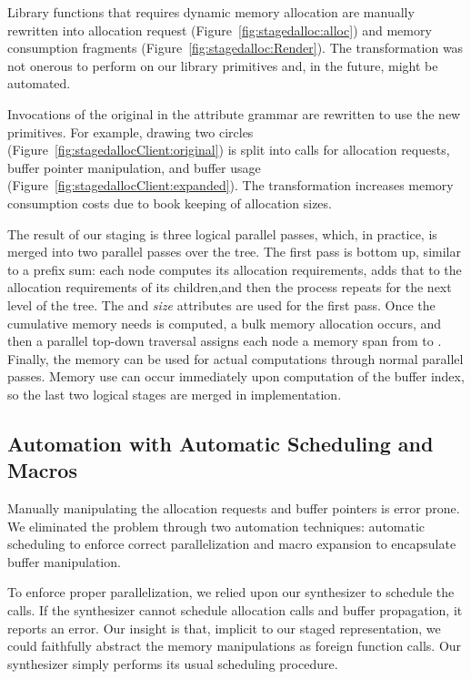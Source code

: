 Library functions that requires dynamic memory allocation are manually rewritten into allocation request  (Figure~\ref{fig:stagedalloc:alloc}) and memory consumption fragments (Figure~\ref{fig:stagedalloc:Render}). The transformation was not onerous to perform on our library primitives and, in the future, might be automated. 

Invocations of the original in the attribute grammar are rewritten to use the new primitives. For example, drawing two circles (Figure~\ref{fig:stagedallocClient:original}) is split into calls for allocation requests, buffer pointer manipulation, and buffer usage (Figure~\ref{fig:stagedallocClient:expanded}). The transformation increases memory consumption costs due to book keeping of allocation sizes. 

The result of our staging is three logical parallel passes, which, in practice, is merged into two parallel passes over the tree. The first pass is bottom up, similar to a prefix sum: each node computes its allocation requirements, adds that to the allocation requirements of its children,and then the process repeats for the next level of the tree. The  and \emph{size} attributes are used for the first pass. Once the cumulative memory needs is computed, a bulk memory allocation occurs, and then a parallel top-down traversal assigns each node a memory span from  to . Finally, the memory can be used for actual computations through normal parallel passes. Memory use can occur immediately upon computation of the buffer index, so the last two logical stages are merged in implementation.

\subsection{Automation with Automatic Scheduling and Macros}
Manually manipulating the allocation requests and buffer pointers is error prone. We eliminated the problem through two automation techniques: automatic scheduling to enforce correct parallelization and macro expansion to encapsulate buffer manipulation.

To enforce proper parallelization, we relied upon our synthesizer to schedule the calls. If the synthesizer cannot schedule allocation calls and buffer propagation, it reports an error. Our insight is that, implicit to our staged representation, we could faithfully abstract the memory manipulations as foreign function calls. Our synthesizer simply performs its usual scheduling procedure.

